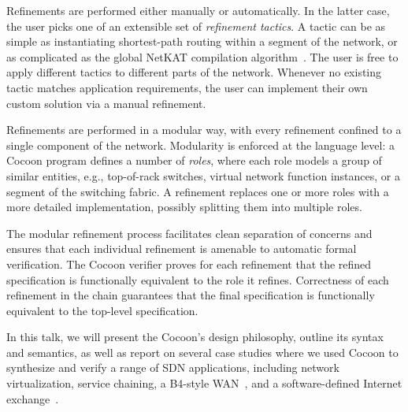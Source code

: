 \documentclass[letterpaper,10pt,twocolumn]{article}
\begin{document}
%

Refinements are performed either manually or automatically.  In 
the latter case, the user picks one of an extensible set of 
\emph{refinement tactics}.  A tactic can be as simple as 
instantiating shortest-path routing within a segment of the 
network, or as complicated as the global NetKAT compilation 
algorithm~\cite{Smolka_EFG_15}.  The user is free to apply 
different tactics to different parts of the network.  Whenever no 
existing tactic matches application requirements, the user can 
implement their own custom solution via a manual refinement.

Refinements are performed in a modular way, with every refinement 
confined to a single component of the network.  Modularity is 
enforced at the language level: a Cocoon program defines a number 
of \emph{roles}, where each role models a group of similar 
entities, e.g., top-of-rack switches, virtual network function 
instances, or a segment of the switching fabric.  A refinement 
replaces one or more roles with a more detailed implementation, 
possibly splitting them into multiple roles.  

The modular refinement process facilitates clean separation of 
concerns and ensures that each individual refinement is amenable 
to automatic formal verification.  The Cocoon verifier proves for 
each refinement that the refined specification is functionally 
equivalent to the role it refines.  Correctness of each refinement 
in the chain guarantees that the final specification is 
functionally equivalent to the top-level specification.  


In this talk, we will present the Cocoon's design philosophy, 
outline its syntax and semantics, as well as report on several 
case studies where we used Cocoon to synthesize and verify a range 
of SDN applications, including network virtualization, service 
chaining, a B4-style WAN~\cite{Jain_KMOPSVWZZZHSV_13}, and a 
software-defined Internet exchange~\cite{Gupta_MBCFRV_16}. 



\setlength{\bibsep}{1pt}
%
\renewcommand{\bibfont}{\footnotesize}


\end{document}
